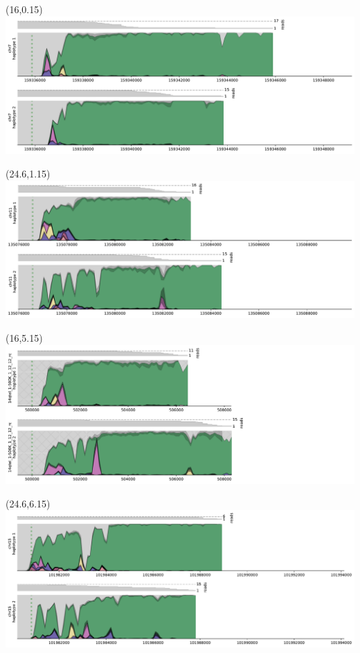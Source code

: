 \documentclass{article}
\begin{document}
\begin{textblock}{11}(16,0.15)   \includegraphics[width=11in]{main-figure-assets/densityplots/chr7-haps.pdf}                     \end{textblock}
\begin{textblock}{11}(24.6,1.15) \includegraphics[width=11in]{main-figure-assets/densityplots/chr11-haps.pdf}                    \end{textblock}
\begin{textblock}{11}(16,5.15)   \includegraphics[width=11in]{main-figure-assets/densityplots/14qtel_1-500K_1_12_12_rc-haps.pdf} \end{textblock}
\begin{textblock}{11}(24.6,6.15) \includegraphics[width=11in]{main-figure-assets/densityplots/chr15-haps.pdf}                    \end{textblock}
\end{document}
